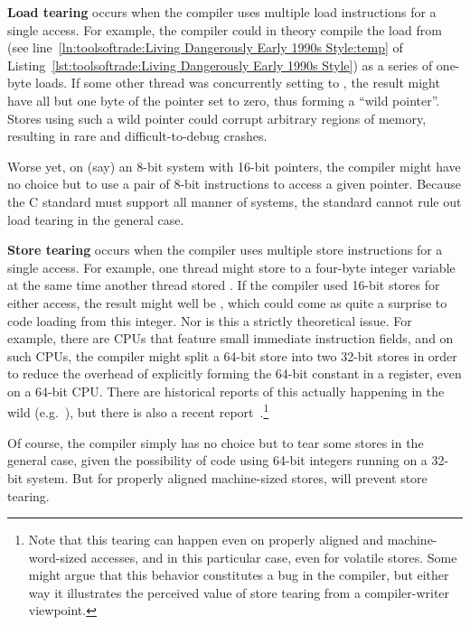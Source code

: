 {\bf Load tearing} occurs when the compiler uses multiple load
instructions for a single access.
For example, the compiler could in theory compile the load from
 (see
line~\ref{ln:toolsoftrade:Living Dangerously Early 1990s Style:temp} of
Listing~\ref{lst:toolsoftrade:Living Dangerously Early 1990s Style})
as a series of one-byte loads.
If some other thread was concurrently setting  to
, the result might have all but one byte of the pointer
set to zero, thus forming a ``wild pointer''.
Stores using such a wild pointer could corrupt arbitrary
regions of memory, resulting in rare and difficult-to-debug crashes.

Worse yet, on (say) an 8-bit system with 16-bit pointers, the compiler
might have no choice but to use a pair of 8-bit instructions to access
a given pointer.
Because the C standard must support all manner of systems, the standard
cannot rule out load tearing in the general case.

{\bf Store tearing} occurs when the compiler uses multiple store
instructions for a single access.
For example, one thread might store  to a four-byte integer
variable at the same time another thread stored .
If the compiler used 16-bit stores for either access, the result
might well be , which could come as quite a surprise to
code loading from this integer.
Nor is this a strictly theoretical issue.
For example, there are CPUs that feature small immediate instruction
fields, and on such CPUs, the compiler might split a 64-bit store into
two 32-bit stores in order to reduce the overhead of explicitly forming
the 64-bit constant in a register, even on a 64-bit CPU\@.
There are historical reports of this actually happening in
the wild (e.g.~\cite{KonstantinKhlebnikov2013gccstoretearing}),
but there is also a recent
report~\cite{WillDeacon2019StoreTearingReport}.\footnote{
	Note that this tearing can happen even on properly aligned
        and machine-word-sized accesses, and in this particular case,
	even for volatile stores.
	Some might argue that this behavior constitutes a bug in the
	compiler, but either way it illustrates the perceived value of
	store tearing from a compiler-writer viewpoint.
}

Of course, the compiler simply has no choice but to tear some stores
in the general case, given
the possibility of code using 64-bit integers running on a 32-bit system.
But for properly aligned machine-sized stores,  will
prevent store tearing.

